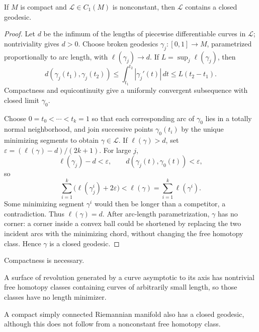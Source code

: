 \begin{theorem}
  \label{thm:dc-ch12-2-2}
  If $M$ is compact and $\mathcal L\in C_1(M)$ is nonconstant, then
  $\mathcal L$ contains a closed geodesic.
\end{theorem}
\begin{proof}
  \sketch
  Let $d$ be the infimum of the lengths of piecewise differentiable curves in
  $\mathcal L$; nontriviality gives $d>0$. Choose broken geodesics
  $\gamma_j:[0,1]\to M$, parametrized proportionally to arc length, with
  $\ell(\gamma_j)\to d$. If $L=\sup_j\ell(\gamma_j)$, then
  \[
    d(\gamma_j(t_1),\gamma_j(t_2))
    \leq \int_{t_1}^{t_2}|\gamma_j'(t)|\,dt
    \leq L(t_2-t_1).
  \]
  Compactness and equicontinuity give a uniformly convergent subsequence with
  closed limit $\gamma_0$.

  Choose $0=t_0<\cdots<t_k=1$ so that each corresponding arc of $\gamma_0$
  lies in a totally normal neighborhood, and join successive points
  $\gamma_0(t_i)$ by the unique minimizing segments to obtain
  $\gamma\in\mathcal L$. If $\ell(\gamma)>d$, set
  $\varepsilon=(\ell(\gamma)-d)/(2k+1)$. For large $j$,
  \[
    \ell(\gamma_j)-d<\varepsilon,
    \qquad d(\gamma_j(t),\gamma_0(t))<\varepsilon,
  \]
  so
  \[
    \sum_{i=1}^k\bigl(\ell(\gamma_j^i)+2\varepsilon\bigr)
    <\ell(\gamma)=\sum_{i=1}^k\ell(\gamma^i).
  \]
  Some minimizing segment $\gamma^i$ would then be longer than a competitor,
  a contradiction. Thus $\ell(\gamma)=d$. After arc-length parametrization,
  $\gamma$ has no corner: a corner inside a convex ball could be shortened by
  replacing the two incident arcs with the minimizing chord, without changing
  the free homotopy class. Hence $\gamma$ is a closed geodesic.
\end{proof}

\begin{remark}
  \label{rem:dc-ch12-2-3}
  Compactness is necessary.

  \sketch
  A surface of revolution generated by a curve
  asymptotic to its axis has nontrivial free homotopy classes containing curves
  of arbitrarily small length, so those classes have no length minimizer.
\end{remark}

\begin{remark}
  \label{rem:dc-ch12-2-4}
  A compact simply connected Riemannian manifold also has a closed geodesic,
  although this does not follow from a nonconstant free homotopy class.
\end{remark}

